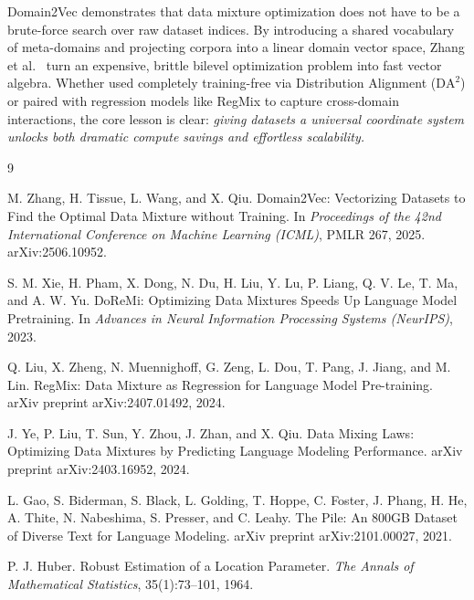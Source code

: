 \documentclass[12pt]{article}
\begin{document}
Domain2Vec demonstrates that data mixture optimization does not have to be a brute-force search over raw dataset indices. By introducing a shared vocabulary of meta-domains and projecting corpora into a linear domain vector space, Zhang et al.~\cite{zhang2025domain2vec} turn an expensive, brittle bilevel optimization problem into fast vector algebra. Whether used completely training-free via Distribution Alignment ($\mathrm{DA}^2$) or paired with regression models like RegMix to capture cross-domain interactions, the core lesson is clear: \emph{giving datasets a universal coordinate system unlocks both dramatic compute savings and effortless scalability.}

\begin{thebibliography}{9}

M. Zhang, H. Tissue, L. Wang, and X. Qiu.
\newblock Domain2Vec: Vectorizing Datasets to Find the Optimal Data Mixture without Training.
\newblock In \emph{Proceedings of the 42nd International Conference on Machine Learning (ICML)}, PMLR 267, 2025. arXiv:2506.10952.

S. M. Xie, H. Pham, X. Dong, N. Du, H. Liu, Y. Lu, P. Liang, Q. V. Le, T. Ma, and A. W. Yu.
\newblock DoReMi: Optimizing Data Mixtures Speeds Up Language Model Pretraining.
\newblock In \emph{Advances in Neural Information Processing Systems (NeurIPS)}, 2023.

Q. Liu, X. Zheng, N. Muennighoff, G. Zeng, L. Dou, T. Pang, J. Jiang, and M. Lin.
\newblock RegMix: Data Mixture as Regression for Language Model Pre-training.
\newblock arXiv preprint arXiv:2407.01492, 2024.

J. Ye, P. Liu, T. Sun, Y. Zhou, J. Zhan, and X. Qiu.
\newblock Data Mixing Laws: Optimizing Data Mixtures by Predicting Language Modeling Performance.
\newblock arXiv preprint arXiv:2403.16952, 2024.

L. Gao, S. Biderman, S. Black, L. Golding, T. Hoppe, C. Foster, J. Phang, H. He, A. Thite, N. Nabeshima, S. Presser, and C. Leahy.
\newblock The Pile: An 800GB Dataset of Diverse Text for Language Modeling.
\newblock arXiv preprint arXiv:2101.00027, 2021.

P. J. Huber.
\newblock Robust Estimation of a Location Parameter.
\newblock \emph{The Annals of Mathematical Statistics}, 35(1):73--101, 1964.

\end{thebibliography}
\end{document}
